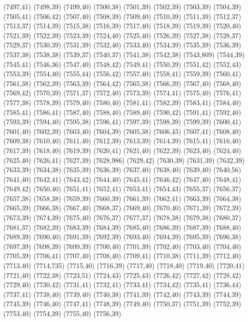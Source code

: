(7497,41)
(7498,39)
(7499,40)
(7500,38)
(7501,39)
(7502,39)
(7503,39)
(7504,39)
(7505,41)
(7506,42)
(7507,40)
(7508,39)
(7509,40)
(7510,39)
(7511,39)
(7512,37)
(7513,37)
(7514,39)
(7515,38)
(7516,39)
(7517,40)
(7518,39)
(7519,39)
(7520,40)
(7521,39)
(7522,39)
(7523,39)
(7524,40)
(7525,40)
(7526,39)
(7527,38)
(7528,37)
(7529,37)
(7530,39)
(7531,39)
(7532,40)
(7533,40)
(7534,39)
(7535,39)
(7536,39)
(7537,38)
(7538,38)
(7539,37)
(7540,37)
(7541,38)
(7542,38)
(7543,809)
(7544,39)
(7545,41)
(7546,36)
(7547,40)
(7548,42)
(7549,41)
(7550,39)
(7551,42)
(7552,43)
(7553,39)
(7554,40)
(7555,44)
(7556,42)
(7557,40)
(7558,41)
(7559,39)
(7560,41)
(7561,38)
(7562,39)
(7563,39)
(7564,42)
(7565,38)
(7566,39)
(7567,40)
(7568,40)
(7569,42)
(7570,39)
(7571,37)
(7572,40)
(7573,39)
(7574,41)
(7575,40)
(7576,41)
(7577,38)
(7578,39)
(7579,40)
(7580,40)
(7581,41)
(7582,39)
(7583,41)
(7584,40)
(7585,41)
(7586,41)
(7587,40)
(7588,40)
(7589,40)
(7590,42)
(7591,41)
(7592,40)
(7593,39)
(7594,40)
(7595,38)
(7596,41)
(7597,39)
(7598,39)
(7599,39)
(7600,41)
(7601,40)
(7602,39)
(7603,40)
(7604,39)
(7605,38)
(7606,45)
(7607,41)
(7608,40)
(7609,38)
(7610,40)
(7611,40)
(7612,39)
(7613,39)
(7614,39)
(7615,41)
(7616,40)
(7617,39)
(7618,40)
(7619,39)
(7620,41)
(7621,40)
(7622,39)
(7623,40)
(7624,40)
(7625,40)
(7626,41)
(7627,39)
(7628,986)
(7629,42)
(7630,39)
(7631,39)
(7632,39)
(7633,39)
(7634,38)
(7635,39)
(7636,39)
(7637,40)
(7638,40)
(7639,40)
(7640,56)
(7641,40)
(7642,41)
(7643,42)
(7644,40)
(7645,41)
(7646,42)
(7647,40)
(7648,41)
(7649,42)
(7650,40)
(7651,41)
(7652,41)
(7653,41)
(7654,43)
(7655,37)
(7656,37)
(7657,38)
(7658,38)
(7659,39)
(7660,39)
(7661,39)
(7662,41)
(7663,39)
(7664,38)
(7665,39)
(7666,38)
(7667,40)
(7668,37)
(7669,40)
(7670,40)
(7671,39)
(7672,39)
(7673,39)
(7674,39)
(7675,40)
(7676,37)
(7677,37)
(7678,38)
(7679,38)
(7680,37)
(7681,37)
(7682,39)
(7683,39)
(7684,39)
(7685,40)
(7686,39)
(7687,39)
(7688,40)
(7689,39)
(7690,40)
(7691,39)
(7692,39)
(7693,40)
(7694,39)
(7695,39)
(7696,38)
(7697,39)
(7698,39)
(7699,39)
(7700,40)
(7701,39)
(7702,40)
(7703,40)
(7704,40)
(7705,39)
(7706,41)
(7707,40)
(7708,40)
(7709,41)
(7710,38)
(7711,39)
(7712,40)
(7713,40)
(7714,735)
(7715,40)
(7716,39)
(7717,40)
(7718,40)
(7719,40)
(7720,41)
(7721,40)
(7722,38)
(7723,51)
(7724,43)
(7725,43)
(7726,42)
(7727,42)
(7728,42)
(7729,40)
(7730,42)
(7731,41)
(7732,41)
(7733,41)
(7734,42)
(7735,41)
(7736,44)
(7737,41)
(7738,40)
(7739,40)
(7740,38)
(7741,39)
(7742,40)
(7743,39)
(7744,39)
(7745,39)
(7746,40)
(7747,41)
(7748,39)
(7749,40)
(7750,37)
(7751,39)
(7752,39)
(7753,40)
(7754,39)
(7755,40)
(7756,39)
